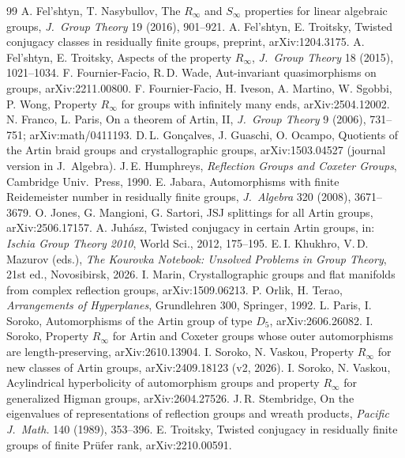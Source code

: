 \documentclass[11pt]{amsart}
\theoremstyle{definition}
\begin{document}
\begin{thebibliography}{99}
 A. Fel'shtyn, T. Nasybullov, The $R_\infty$ and $S_\infty$ properties for linear algebraic groups, \emph{J.\ Group Theory} 19 (2016), 901--921.
 A. Fel'shtyn, E. Troitsky, Twisted conjugacy classes in residually finite groups, preprint, arXiv:1204.3175.
 A. Fel'shtyn, E. Troitsky, Aspects of the property $R_\infty$, \emph{J.\ Group Theory} 18 (2015), 1021--1034.
 F. Fournier-Facio, R.\,D. Wade, Aut-invariant quasimorphisms on groups, arXiv:2211.00800.
 F. Fournier-Facio, H. Iveson, A. Martino, W. Sgobbi, P. Wong, Property $R_\infty$ for groups with infinitely many ends, arXiv:2504.12002.
 N. Franco, L. Paris, On a theorem of Artin, II, \emph{J.\ Group Theory} 9 (2006), 731--751; arXiv:math/0411193.
 D.\,L. Gon\c{c}alves, J. Guaschi, O. Ocampo, Quotients of the Artin braid groups and crystallographic groups, arXiv:1503.04527 (journal version in J.\ Algebra).
 J.\,E. Humphreys, \emph{Reflection Groups and Coxeter Groups}, Cambridge Univ.\ Press, 1990.
 E. Jabara, Automorphisms with finite Reidemeister number in residually finite groups, \emph{J.\ Algebra} 320 (2008), 3671--3679.
 O. Jones, G. Mangioni, G. Sartori, JSJ splittings for all Artin groups, arXiv:2506.17157.
 A. Juh\'asz, Twisted conjugacy in certain Artin groups, in: \emph{Ischia Group Theory 2010}, World Sci., 2012, 175--195.
 E.\,I. Khukhro, V.\,D. Mazurov (eds.), \emph{The Kourovka Notebook: Unsolved Problems in Group Theory}, 21st ed., Novosibirsk, 2026.
 I. Marin, Crystallographic groups and flat manifolds from complex reflection groups, arXiv:1509.06213.
 P. Orlik, H. Terao, \emph{Arrangements of Hyperplanes}, Grundlehren 300, Springer, 1992.
 L. Paris, I. Soroko, Automorphisms of the Artin group of type $D_5$, arXiv:2606.26082.
 I. Soroko, Property $R_\infty$ for Artin and Coxeter groups whose outer automorphisms are length-preserving, arXiv:2610.13904.
 I. Soroko, N. Vaskou, Property $R_\infty$ for new classes of Artin groups, arXiv:2409.18123 (v2, 2026).
 I. Soroko, N. Vaskou, Acylindrical hyperbolicity of automorphism groups and property $R_\infty$ for generalized Higman groups, arXiv:2604.27526.
 J.\,R. Stembridge, On the eigenvalues of representations of reflection groups and wreath products, \emph{Pacific J.\ Math.} 140 (1989), 353--396.
 E. Troitsky, Twisted conjugacy in residually finite groups of finite Pr\"ufer rank, arXiv:2210.00591.
\end{thebibliography}
\end{document}
